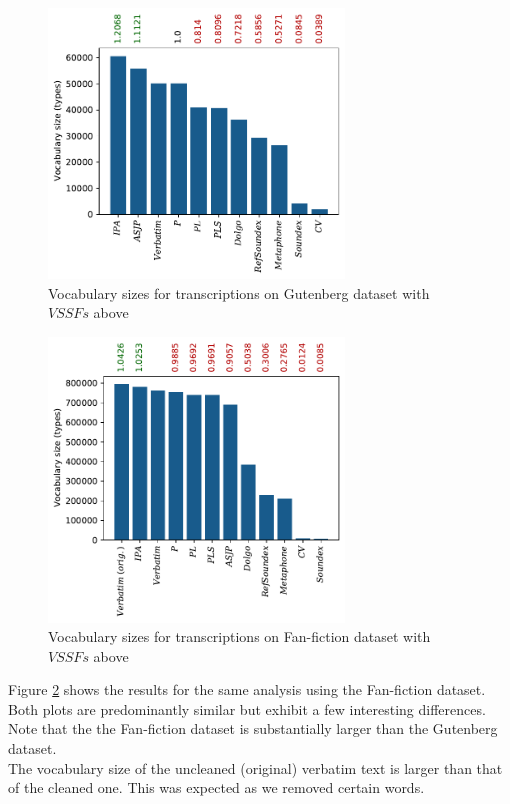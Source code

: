 \begin{figure}
  \centering
  \includegraphics[width=0.7\textwidth]{figures/vocab_sizes_2021-07-28_14-42-08_gb_pt}
  \caption{Vocabulary sizes for transcriptions on Gutenberg dataset with $VSSFs$ above}
  \label{fig:vssf_transcriptions_gb}
\end{figure}
\begin{figure}
  \centering
  \includegraphics[width=0.7\textwidth]{figures/vocab_sizes_2021-07-27_16-57-38_ff_pt}
  \caption{Vocabulary sizes for transcriptions on Fan-fiction dataset with $VSSFs$ above}
  \label{fig:vssf_transcriptions_ff}
\end{figure}

Figure \ref{fig:vssf_transcriptions_ff} shows the results for the same analysis using the Fan-fiction dataset.
Both plots are predominantly similar but exhibit a few interesting differences.
Note that the the Fan-fiction dataset is substantially larger than the Gutenberg dataset.\\
The vocabulary size of the uncleaned (original) verbatim text is larger than that of the cleaned one.
This was expected as we removed certain words.




